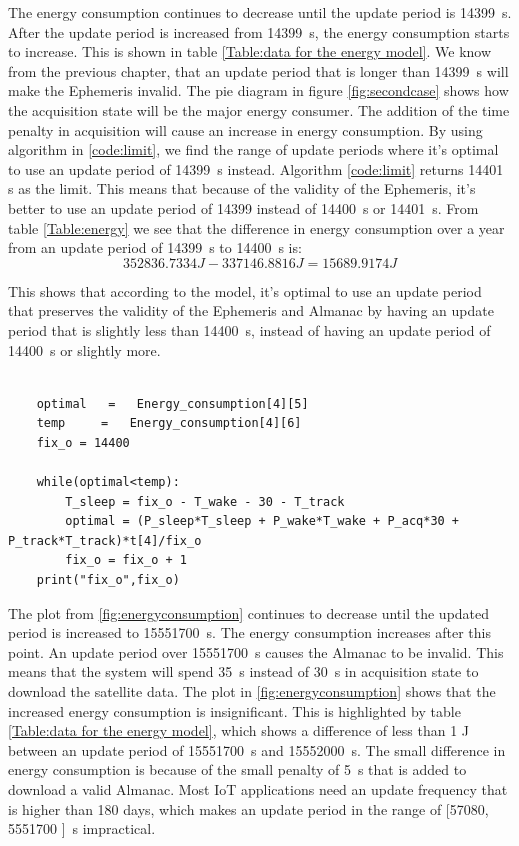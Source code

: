 The energy consumption continues to decrease until the update period is 14399 \,s. After the update period is increased from 14399 \,s, the energy consumption starts to increase. This is shown in table \ref{Table:data for the energy model}. We know from the previous chapter, that an update period that is longer than 14399 \,s will make the Ephemeris invalid. The pie diagram in figure \ref{fig:secondcase} shows how the acquisition state will be the major energy consumer. The addition of the time penalty in acquisition will cause an increase in energy consumption. By using algorithm in \ref{code:limit}, we find the range of update periods where it's optimal to use an update period of 14399 \,s instead. Algorithm \ref{code:limit} returns 14401 \,s as the limit. This means that because of the validity of the Ephemeris, it's better to use an update period of 14399 instead of 14400 \,s or 14401 \,s. From table \ref{Table:energy} we see that the difference in energy consumption over a year from an update period of 14399 \,s to 14400 \,s is:
\begin{equation}
352836.7334 J - 337146.8816 J = 15689.9174 J
\end{equation}

This shows that according to the model, it's optimal to use an update period that preserves the validity of the Ephemeris and Almanac by having an update period that is slightly less than 14400 \,s, instead of having an update period of 14400 \,s or slightly more.  


\lstset{language=Python}          %
\begin{lstlisting}[frame=single, caption= Code used for finding the beneficial limit]  % Start your code-block

    optimal   =   Energy_consumption[4][5]
    temp     =   Energy_consumption[4][6]
    fix_o = 14400

    while(optimal<temp):  
        T_sleep = fix_o - T_wake - 30 - T_track
        optimal = (P_sleep*T_sleep + P_wake*T_wake + P_acq*30 + P_track*T_track)*t[4]/fix_o
        fix_o = fix_o + 1
    print("fix_o",fix_o)

\end{lstlisting}
\label{code:limit}


The plot from \ref{fig:energyconsumption} continues to decrease until the updated period is increased to 15551700 \,s. The energy consumption increases after this point. An update period over 15551700 \,s causes the Almanac to be invalid. This means that the system will spend 35 \,s instead of 30 \,s in acquisition state to download the satellite data. The plot in \ref{fig:energyconsumption} shows that the increased energy consumption is insignificant. This is highlighted by table \ref{Table:data for the energy model}, which shows a difference of less than 1 J between an update period of 15551700 \,s and 15552000 \,s. The small difference in energy consumption is because of the small penalty of 5 \,s that is added to download a valid Almanac.  Most IoT applications need an update frequency that is higher than 180 days, which makes an update period in the range of [57080, 5551700 ] \,s impractical. 


